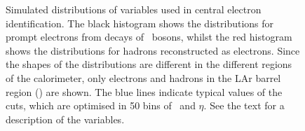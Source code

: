 \begin{figure}[h]
\centering
    \caption[Distributions of electron identification variables for electrons
    and hadrons with : \Rhad, \Reta. \wetatwo, \Eratio, \wstot,
    \fthree]
    {\small Simulated distributions of variables used in central electron
    identification. The black histogram shows the distributions for prompt
    electrons from decays of \Z\ bosons, whilst the red histogram shows the
    distributions for hadrons reconstructed as electrons. Since the shapes of
    the distributions are different in the different regions of the calorimeter,
    only electrons and hadrons in the LAr barrel region () are
    shown. The blue lines indicate typical values of the cuts, which are
    optimised in 50 bins of \pt\ and $\eta$. See the text for a description of
    the variables.}
\label{fig:el-id-showershapes-central-1}
\end{figure}

